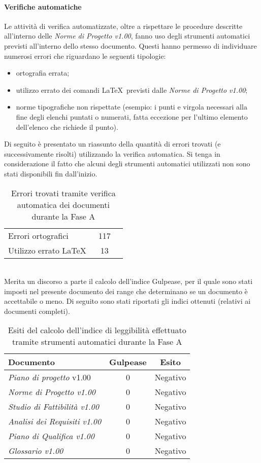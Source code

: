 \documentclass[../PianoDiQualifica.tex]{subfiles}
\begin{document}
\begin{appendices}
			\paragraph{Verifiche automatiche}
			Le attività di verifica automatizzate, oltre a rispettare le procedure descritte all'interno delle \textit{Norme di Progetto v1.00}, fanno uso degli strumenti automatici previsti all'interno dello stesso documento. Questi hanno permesso di individuare numerosi errori che riguardano le seguenti tipologie:
			\begin{itemize}
				\item ortografia errata;
				\item utilizzo errato dei comandi \LaTeX\ previsti dalle \textit{Norme di Progetto v1.00};
				\item norme tipografiche non rispettate (esempio: i punti e virgola necessari alla fine degli elenchi puntati o numerati, fatta eccezione per l'ultimo elemento dell'elenco che richiede il punto).
			\end{itemize}
			Di seguito è presentato un riassunto della quantità di errori trovati (e successivamente risolti) utilizzando la verifica automatica. Si tenga in considerazione il fatto che alcuni degli strumenti automatici utilizzati non sono stati disponibili fin dall'inizio.
\begin{table}[h]
		\centering
		\begin{tabular}{l * {2}{c}}
			\midrule
			Errori ortografici &	117 \\
			Utilizzo errato \LaTeX \ & 13 \\
			\midrule
		\end{tabular}
		\caption{Errori trovati tramite verifica automatica dei documenti durante la Fase A}
		\label{tab:errori_automatica}
\end{table}	
			\\Merita un discorso a parte il calcolo dell'indice Gulpease, per il quale sono stati imposti nel presente documento dei range che determinano se un documento è accettabile o meno. Di seguito sono stati riportati gli indici ottenuti (relativi ai documenti completi).
\begin{table}[h]
		\centering
		\begin{tabular}{l * {2}{c}}
			\toprule
			\textbf{Documento} & \textbf{Gulpease} & \textbf{Esito} \\
			\midrule
			\textit{Piano di progetto} v1.00 & 0 &  Negativo \\
			\textit{Norme di Progetto v1.00} & 0 & Negativo \\
			\textit{Studio di Fattibilità v1.00} & 0 & Negativo \\
			\textit{Analisi dei Requisiti v1.00} & 0 & Negativo \\
			\textit{Piano di Qualifica v1.00} & 0 & Negativo \\
			\textit{Glossario v1.00} & 0 & Negativo \\
			\bottomrule
		\end{tabular}
		\caption{Esiti del calcolo dell’indice di leggibilità effettuato tramite strumenti automatici durante la Fase A}
		\label{tab:esiti_gulpease}
\end{table}

\end{appendices}
\end{document}
